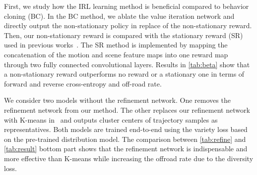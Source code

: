 \documentclass[10pt,twocolumn,letterpaper]{article}
\begin{document}
\begin{table}
    \centering
{}
	\vspace{-0.2cm}
	\caption{Effect of the refinement and training methods in predicting representative trajectories based on the learned trajectory distribution with .}
	\label{tab:refine}
\end{table}

 First, we study how the IRL learning method is beneficial compared to behavior cloning (BC). In the BC method, we ablate the value iteration network and directly output the non-stationary policy in replace of the non-stationary reward. Then, our non-stationary reward is compared with the stationary reward (SR) used in previous works~\cite{pflueger2019rover,deo2020trajectory}. The SR method is implemented by mapping the concatenation of the motion and scene feature maps into one reward map through two fully connected convolutional layers. Results in \cref{tab:beta} show that a non-stationary reward outperforms no reward or a stationary one in terms of forward and reverse cross-entropy and off-road rate.


We consider two models without the refinement network. One removes the refinement network from our method. The other replaces our refinement network with K-means in~\cite{deo2020trajectory} and outputs  cluster centers of trajectory samples as representatives. Both models are trained end-to-end using the variety loss based on the pre-trained distribution model. The comparison between \cref{tab:refine} and \cref{tab:result} bottom part shows that the refinement network is indispensable and more effective than K-means while increasing the offroad rate due to the diversity loss.
\end{document}
